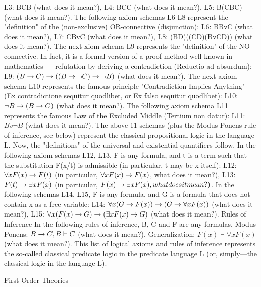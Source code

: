 L3: B\AND C\IMPLIES B (what does it mean?),
L4: B\AND C\IMPLIES C (what does it mean?),
L5: B\IMPLIES (C\IMPLIES B\AND C) (what does it mean?).
The following axiom schemas L6-L8 represent the "definition" of the (non-exclusive) OR-connective
(disjunction):
L6: B\IMPLIES BvC (what does it mean?),
L7: C\IMPLIES BvC (what does it mean?),
L8: (B\IMPLIES D)\IMPLIES ((C\IMPLIES D)\IMPLIES (BvC\IMPLIES D)) (what does it mean?).
The next xiom schema L9 represents the "definition" of the NO-connective. In fact, it is a formal version
of a proof method well-known in mathematics --- refutation by deriving a contradiction (Reductio ad
absurdum):
L9: \((B\rightarrow C)\rightarrow ((B\rightarrow \neg C)\rightarrow \neg B)\) (what does it mean?).
The next axiom schema L10 represents the famous principle "Contradiction Implies Anything" (Ex
contradictione sequitur quodlibet, or Ex falso sequitur quodlibet):
L10:\( \neg B\rightarrow (B\rightarrow C)\) (what does it mean?).
The following axiom schema L11 represents the famous Law of the Excluded Middle (Tertium non
datur):
L11: \(Bv\neg B\) (what does it mean?).
The above 11 schemas (plus the Modus Ponens rule of inference, see below) represent the classical
propositional logic in the language L.
Now, the "definitions" of the universal and existential quantifiers follow.
In the following axiom schemas L12, L13, F is any formula, and t is a term such that the substitution F(x/t)
is admissible (in particular, t may be x itself):
L12: \(\forall xF(x)\rightarrow F(t)\) (in particular, \(\forall xF(x)\rightarrow F(x)\), what does it mean?),
L13: \(F(t)\rightarrow \exists xF(x)\) (in particular, \(F(x)\rightarrow \exists xF(x), what does it mean?)\).
In the following schemas L14, L15, F is any formula, and G is a formula that does not contain x as a free
variable:
L14: \(\forall x(G\rightarrow F(x))\rightarrow (G\rightarrow \forall xF(x))\) (what does it mean?),
L15: \(\forall x(F(x)\rightarrow G)\rightarrow (\exists xF(x)\rightarrow G)\) (what does it mean?).
Rules of Inference
In the following rules of inference, B, C and F are any formulas.
Modus Ponens: \(B\rightarrow C, B \vdash C\) (what does it mean?).
Generalization: \(F(x) \vdash \forall xF(x)\) (what does it mean?).
This list of logical axioms and rules of inference represents the so-called classical predicate logic in the
predicate language L (or, simply---the classical logic in the language L).

First Order Theories

